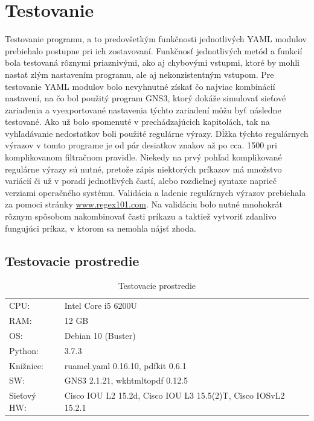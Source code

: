 \chapter{Testovanie}
Testovanie programu, a to predovšetkým funkčnosti jednotlivých YAML modulov prebiehalo postupne pri ich zostavovaní. Funkčnosť jednotlivých metód a funkcií bola testovaná rôznymi priaznivými, ako aj chybovými vstupmi, ktoré by mohli nastať zlým nastavením programu, ale aj nekonzistentným vstupom. Pre testovanie YAML modulov bolo nevyhnutné získať čo najviac kombinácií nastavení, na čo bol použitý program GNS3, ktorý dokáže simulovať sieťové zariadenia a vyexportované nastavenia týchto zariadení môžu byť následne testované. Ako už bolo spomenuté v prechádzajúcich kapitolách, tak na vyhľadávanie nedostatkov boli použité regulárne výrazy. Dĺžka týchto regulárnych výrazov v tomto programe je od pár desiatkov znakov až po cca. 1500 pri komplikovanom filtračnom pravidle. Niekedy na prvý pohľad komplikované regulárne výrazy sú nutné, pretože zápis niektorých príkazov má množstvo variácií či už v poradí jednotlivých častí, alebo rozdielnej syntaxe naprieč verziami operačného systému. Validácia a ladenie regulárnych výrazov  prebiehala za pomoci stránky \url{www.regex101.com}. Na validáciu bolo nutné mnohokrát rôznym spôsobom nakombinovať časti príkazu a taktiež vytvoriť zdanlivo fungujúci príkaz, v ktorom sa nemohla nájsť zhoda.  

\section{Testovacie prostredie}
\begin{table}[H]
	\begin{tabular}{l|l}
		CPU:        & Intel Core i5 6200U                                            \\
		RAM:        & 12 GB                                                          \\
		OS:         & Debian 10 (Buster)                                             \\
		Python:     & 3.7.3                                                          \\
		Knižnice:   & ruamel.yaml 0.16.10, pdfkit 0.6.1                              \\
		SW:         & GNS3 2.1.21, wkhtmltopdf 0.12.5                                \\
		Sieťový HW: & Cisco IOU L2 15.2d, Cisco IOU L3 15.5(2)T, Cisco IOSvL2 15.2.1
	\end{tabular}
	\caption{Testovacie prostredie}
	\label{tab:test_conf}
\end{table}
 

